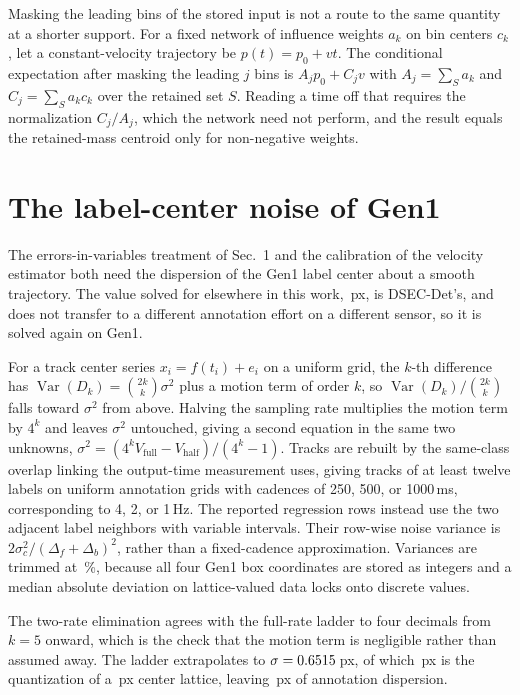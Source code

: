 \documentclass[10pt,twocolumn,letterpaper]{article}
\begin{document}
Masking the leading bins of the stored input is not a route to the same quantity
at a shorter support. For a fixed network of influence weights $a_{k}$ on bin
centers $c_{k}$, let a constant-velocity trajectory be
$p(t)=p_{0}+vt$. The conditional expectation after masking the leading $j$ bins
is $A_{j}p_{0}+C_{j}v$ with $A_{j}=\sum_{S}a_{k}$ and $C_{j}=\sum_{S}a_{k}c_{k}$
over the retained set $S$. Reading a time off that requires the normalization
$C_{j}/A_{j}$, which the network need not perform, and the result equals the
retained-mass centroid only for non-negative weights.

\section{The label-center noise of Gen1}
\label{sup:labelnoise}

The errors-in-variables treatment of Sec.~1 and the calibration of the velocity
estimator both need the dispersion of the Gen1 label center about a smooth
trajectory. The value solved for elsewhere in this work, \sigmaCtotal\,px, is
DSEC-Det's, and does not transfer to a different annotation effort on a different
sensor, so it is solved again on Gen1.

For a track center series $x_i=f(t_i)+e_i$ on a uniform grid, the $k$-th
difference has $\operatorname{Var}(D_k)=\binom{2k}{k}\sigma^{2}$ plus a motion
term of order $k$, so $\operatorname{Var}(D_k)/\binom{2k}{k}$ falls toward
$\sigma^{2}$ from above. Halving the sampling rate multiplies the motion term by
$4^{k}$ and leaves $\sigma^{2}$ untouched, giving a second equation in the same
two unknowns, $\sigma^{2}=(4^{k}V_{\text{full}}-V_{\text{half}})/(4^{k}-1)$.
Tracks are rebuilt by the same-class overlap linking the output-time
measurement uses, giving  tracks of at least twelve labels on
uniform annotation grids with cadences of 250, 500, or 1000\,ms, corresponding
to 4, 2, or 1\,Hz. The reported regression rows instead use the two adjacent
label neighbors with variable intervals. Their row-wise noise variance is
$2\sigma_c^2/(\Delta_f+\Delta_b)^2$, rather than a fixed-cadence approximation.
Variances are trimmed at \ladderTrimPct\,\%, because all four Gen1 box
coordinates are stored as integers and a median absolute deviation on
lattice-valued data locks onto discrete values.

The two-rate elimination agrees with the full-rate ladder to four decimals from
$k=5$ onward, which is the check that the motion term is negligible rather than
assumed away. The ladder extrapolates to $\sigma=0.6515$\,px, of which
\,px is the quantization of a \sigmaClattice\,px center lattice, leaving
\,px of annotation dispersion.
\end{document}
